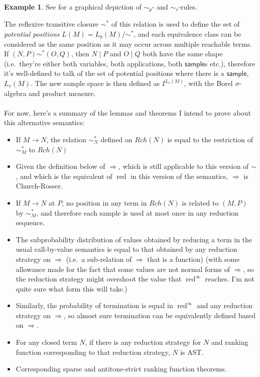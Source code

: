 \documentclass{article}
\newcommand{\tsample}{\textsf{sample}}
\DeclareMathOperator{\red}{red}
\theoremstyle{definition}
\newtheorem{example}{Example}
\theoremstyle{lemma}
\theoremstyle{remark}
\begin{document}
\begin{example}
See  for a graphical depiction of $\sim_p$- and $\sim_c$-rules.
\end{example}

The reflexive transitive closure $\sim^*$ of this relation is used to define the set of \emph{potential positions} $L(M) = L_0(M) / \sim^*$, and each equivalence class can be considered as the same position as it may occur across multiple reachable terms. 
If $(N,P) \sim^* (O,Q)$, then $N \mid P$ and $O \mid Q$ both have the same shape (i.e.~they're either both variables, both applications, both $\tsample$s etc.), therefore it's well-defined to talk of the set of potential positions where there is a $\tsample$, $L_s(M)$. 
\lo{Thus $L_s(M) := \{[(X, P)]_{\sim^\ast_M} : X \mid P = \tsample\}$.}
The new sample space is then defined as $I^{L_s(M)}$, with the Borel $\sigma$-algebra and product measure.

\paragraph{}
For now, here's a summary of the lemmas and theorems I intend to prove about this alternative semantics:
\begin{itemize}
    \item If $M \to N$, the relation $\sim_N^*$ defined on $Rch(N)$ is equal to the restriction of $\sim_M^*$ to $Rch(N)$ %
    \item Given the definition below of $\Rightarrow$, which is still applicable to this version of $\sim$, and which is the equivalent of $\red$ in this version of the semantics, $\Rightarrow$ is Church-Rosser.
    \item If $M \to N$ at $P$, no position in any term in $Rch(N)$ is related to $(M,P)$ by $\sim_M^*$, and therefore each sample is used at most once in any reduction sequence.
    \item The subprobability distribution of values obtained by reducing a term in the usual call-by-value semantics is equal to that obtained by any reduction strategy on $\Rightarrow$ (i.e.~a sub-relation of $\Rightarrow$ that is a function) (with some allowance made for the fact that some values are not normal forms of $\Rightarrow$, so the reduction strategy might overshoot the value that $\red^\infty$ reaches. I'm not quite sure what form this will take.)
    \item Similarly, the probability of termination is equal in $\red^\infty$ and any reduction strategy on $\Rightarrow$, so almost sure termination can be equivalently defined based on $\Rightarrow$.
    \item For any closed term $N$, if there is any reduction strategy for $N$ and ranking function corresponding to that reduction strategy, $N$ is AST.
    \item Corresponding sparse and antitone-strict ranking function theorems.
\end{itemize}
\end{document}
